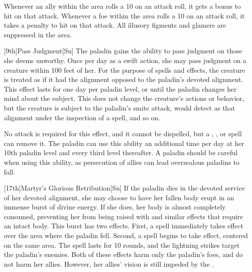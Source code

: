 Whenever an ally within the area rolls a 10 on an attack roll, it gets a  bonus to hit on that attack.
Whenever a foe within the area rolls a 10 on an attack roll, it takes a  penalty to hit on that attack.
All illusory figments and glamers are suppressed in the area.

[9th]{Pass Judgment}[Su]
The paladin gains the ability to pass judgment on those she deems unworthy.
Once per day as a swift action, she may pass judgment on a creature within 100 feet of her.
For the purpose of spells and effects, the creature is treated as if it had the alignment opposed to the paladin's devoted alignment.
This effect lasts for one day per paladin level, or until the paladin changes her mind about the subject.
This does not change the creature's actions or behavior, but the creature is subject to the paladin's smite attack, would detect as that alignment under the inspection of a  spell, and so on.

No attack is required for this effect, and it cannot be dispelled, but a , , or  spell can remove it.
The paladin can use this ability an additional time per day at her 10th paladin level and every third level thereafter.
A paladin should be careful when using this ability, as persecution of allies can lead overzealous paladins to fall.

[17th]{Martyr's Glorious Retribution}[Su]
If the paladin dies in the devoted service of her devoted alignment, she may choose to have her fallen body erupt in an immense burst of divine energy.
If she does, her body is almost completely consumed, preventing her from being raised with  and similar effects that require an intact body.
This burst has two effects.
First, a  spell immediately takes effect over the area where the paladin fell.
Second, a  spell begins to take effect, centered on the same area.
The spell lasts for 10 rounds, and the lightning strikes target the paladin's enemies.
Both of these effects harm only the paladin's foes, and do not harm her allies.
However, her allies' vision is still impeded by the .

